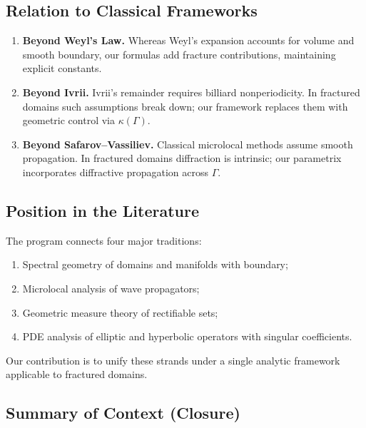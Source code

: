 \subsection*{Relation to Classical Frameworks}

\begin{enumerate}[label=\textbf{R\arabic*}]
    \item \textbf{Beyond Weyl’s Law.} Whereas Weyl’s expansion accounts for volume and 
    smooth boundary, our formulas add fracture contributions, maintaining explicit constants.
    \item \textbf{Beyond Ivrii.} Ivrii’s remainder requires billiard nonperiodicity. 
    In fractured domains such assumptions break down; our framework replaces them with 
    geometric control via $\kappa(\Gamma)$.
    \item \textbf{Beyond Safarov–Vassiliev.} Classical microlocal methods assume smooth 
    propagation. In fractured domains diffraction is intrinsic; our parametrix incorporates 
    diffractive propagation across $\Gamma$.
\end{enumerate}

\subsection*{Position in the Literature}

The program connects four major traditions:
\begin{enumerate}[label=\textbf{L\arabic*}]
    \item Spectral geometry of domains and manifolds with boundary;
    \item Microlocal analysis of wave propagators;
    \item Geometric measure theory of rectifiable sets;
    \item PDE analysis of elliptic and hyperbolic operators with singular coefficients.
\end{enumerate}
Our contribution is to unify these strands under a single analytic framework applicable 
to fractured domains.

\subsection*{Summary of Context (Closure)}

